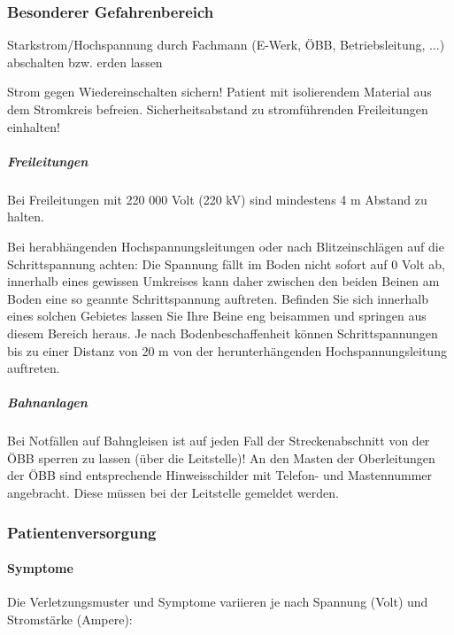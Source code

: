 

\subsubsection{Besonderer Gefahrenbereich}
\label{topic:gefahrenbereich-strom}
Starkstrom/Hochspannung durch Fachmann (E-Werk, ÖBB,
Betriebsleitung, ...) abschalten bzw. erden lassen 

Strom
gegen Wiedereinschalten sichern! Patient mit isolierendem
Material aus dem Stromkreis befreien. Sicherheitsabstand zu
stromführenden Freileitungen einhalten! 

\subparagraph{Freileitungen}


Bei Freileitungen mit
220 000 Volt (220 kV) sind mindestens 4 m Abstand zu halten.
\cite{Jaros1} 

Bei herabhängenden Hochspannungsleitungen oder
nach Blitzeinschlägen auf die Schrittspannung achten: Die
Spannung fällt im Boden nicht sofort auf 0 Volt ab, innerhalb
eines gewissen Umkreises kann daher zwischen den beiden
Beinen am Boden eine so geannte Schrittspannung auftreten.
Befinden Sie sich innerhalb eines solchen Gebietes lassen Sie
Ihre Beine eng beisammen und springen aus diesem Bereich
heraus. Je nach Bodenbeschaffenheit können Schrittspannungen
bis zu einer Distanz von 20 m von der herunterhängenden
Hochspannungsleitung auftreten. \cite{RedelsteinerHRNS1} 

\subparagraph{Bahnanlagen}
Bei
Notfällen auf Bahngleisen ist auf jeden Fall der
Streckenabschnitt von der ÖBB sperren zu lassen (über die
Leitstelle)! An den Masten der Oberleitungen der ÖBB sind
entsprechende Hinweisschilder mit Telefon- und Mastennummer
angebracht. Diese müssen bei der Leitstelle gemeldet werden.
 
\subsubsection{Patientenversorgung}

\paragraph{Symptome} Die Verletzungsmuster und Symptome variieren je nach Spannung (Volt) und Stromst\"arke (Ampere):

